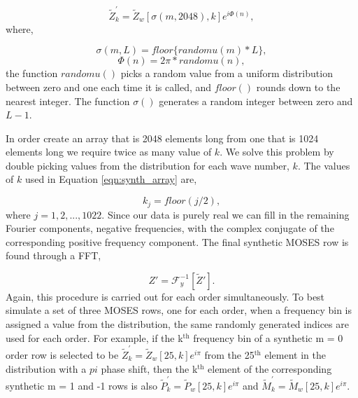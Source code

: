 \documentclass[]{solarphysics}
\begin{document}
\begin{article}
	\begin{equation}
		\widetilde{Z}_k^{'} = \widetilde{Z}_w\left[\sigma(m,2048), k  \right]e^{i\Phi(n)} ,
		\label{eqn:synth_array}
	\end{equation}
	where,
	
	\begin{equation}
		\sigma(m,L) = floor\{randomu(m)*L\} ,
	\end{equation}
	\begin{equation}
		\Phi(n) = 2\pi * randomu(n),
	\end{equation}
	the function $randomu()$ picks a random value from a uniform distribution between zero and one each time it is called, and $floor()$ rounds down to the nearest integer.  The function $\sigma()$ generates a random integer between zero and $L-1$.  
	
	In order create an array that is 2048 elements long from one that is 1024 elements long we require twice as many value of $k$.  We solve this problem by double picking values from the distribution for each wave number, $k$.  The values of $k$ used in Equation \ref{eqn:synth_array} are,
	
	\begin{equation}
		k_j = floor(j/2),
	\end{equation}
	where $j = 1, 2,...,1022.$ Since our data is purely real we can fill in the remaining Fourier components,  negative frequencies, with the complex conjugate of the corresponding positive frequency component.  The final synthetic MOSES row is found through a FFT, 
	
	\begin{equation}
		Z' = \mathcal{F}_y^{-1}[\widetilde{Z}'].
	\end{equation}
	Again, this procedure is carried out for each order simultaneously.  To best simulate a set of three MOSES rows, one for each order, when a frequency bin is assigned a value from the distribution, the same randomly generated indices are used for each order.  For example, if the k$^{\mathrm{th}}$ frequency bin of a synthetic m = 0 order row is selected to be $\widetilde{Z}_k^{'} = \widetilde{Z}_w\left[25, k  \right]e^{i\pi}$ from the 25$^{\mathrm{th}}$ element in the distribution with a $pi$ phase shift, then the k$^{\mathrm{th}}$ element of the corresponding synthetic m = 1 and -1 rows is also  $\widetilde{P}_k^{'} = \widetilde{P}_w\left[25, k  \right]e^{i\pi}$ and  $\widetilde{M}_k^{'} = \widetilde{M}_w\left[25, k  \right]e^{i\pi}$.
	

\end{article}
\end{document}
